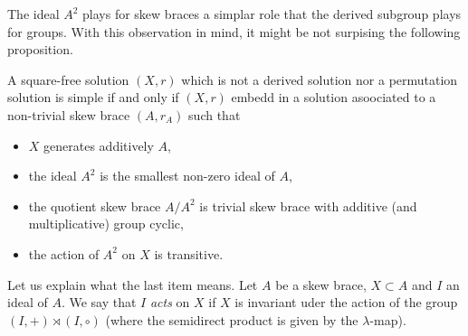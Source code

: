 The ideal $A^2$ plays for skew braces a simplar role that the derived subgroup plays for groups. With this observation in mind, it might be not surpising the following proposition. 

\begin{proposition}
    A square-free solution $(X,r)$ which is not a derived solution nor a permutation solution is simple if and only if $(X,r)$ embedd in a solution asoociated to a non-trivial skew brace $(A,r_A)$ such that
    \begin{itemize}
        \item $X$ generates additively $A$,
        \item the ideal $A^2$ is the smallest non-zero ideal of $A$,
        \item the quotient skew brace $A/A^2$ is trivial skew brace with additive (and multiplicative) group cyclic,
        \item the action of $A^2$ on $X$ is transitive.
    \end{itemize}
\end{proposition}

Let us explain what the last item means. Let $A$ be a skew brace, $X\subset A$ and $I$ an ideal of $A$. We say that $I$ \emph{acts} on $X$ if $X$ is invariant uder the action of the group $(I,+)\rtimes (I,\circ)$ (where the semidirect product is given by the $\lambda$-map).